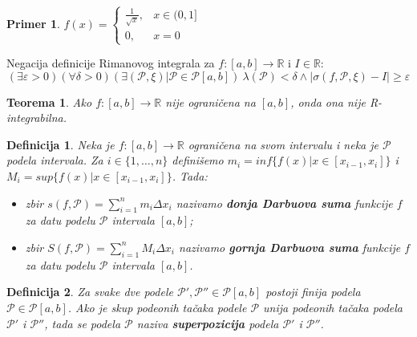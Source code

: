 \documentclass{article}
\newtheorem{definicija}{Definicija}[section]
\newtheorem{teorema}{Teorema}[section]
\newtheorem{prim}{Primer}[section]
\begin{document}
\begin{primbox}
    \begin{prim}
        $f(x)=
            \begin{cases}
                \frac{1}{\sqrt{x}}, & x \in (0,1] \\
                0,                  & x =0
            \end{cases}$
    \end{prim}
    Negacija definicije Rimanovog integrala za $f:[a,b]\longrightarrow\mathbb{R}$ i $I\in\mathbb{R}$:
    $$(\exists\varepsilon>0)(\forall\delta>0)(\exists(\mathcal{P},\xi)\big|\mathcal{P}\in\mathcal{P}[a,b])\ \lambda(\mathcal{P})<\delta\land|\sigma(f,\mathcal{P},\xi)-I|\geq\varepsilon$$
\end{primbox}
\begin{teoremabox}
    \begin{teorema}
        Ako $f: [a,b]\longrightarrow\mathbb{R}$ nije ograničena na $[a,b]$, onda ona nije R-integrabilna.
    \end{teorema}
\end{teoremabox}
\begin{defbox}
    \begin{definicija}
        Neka je $f:[a,b]\longrightarrow\mathbb{R}$ ograničena na svom intervalu i neka je $\mathcal{P}$ podela
        intervala. Za $i\in\{1,\dotsc,n\}$ definišemo $m_i=inf\{f(x)|x\in[x_{i-1},x_i]\}$ i $M_i=sup\{f(x)|x\in[x_{i-1},x_i]\}$.
        Tada:
        \begin{itemize}
            \item zbir $s(f,\mathcal{P})=\sum_{i=1}^{n}m_i\Delta x_i$ nazivamo \textbf{donja Darbuova suma} funkcije $f$ za datu podelu $\mathcal{P}$ intervala $[a,b]$;
            \item zbir $S(f,\mathcal{P})=\sum_{i=1}^{n}M_i\Delta x_i$ nazivamo \textbf{gornja Darbuova suma} funkcije $f$ za datu podelu $\mathcal{P}$ intervala $[a,b]$.
        \end{itemize}
    \end{definicija}
\end{defbox}

\begin{defbox}
    \begin{definicija}
        Za svake dve podele $\mathcal{P}', \mathcal{P}''\in\mathcal{P}[a,b]$ postoji finija
        podela $\mathcal{P}\in\mathcal{P}[a,b]$. Ako je skup podeonih tačaka podele $\mathcal{P}$
        unija podeonih tačaka podela $\mathcal{P}'$ i $\mathcal{P}''$, tada se podela $\mathcal{P}$
        naziva \textbf{superpozicija} podela $\mathcal{P}'$ i $\mathcal{P}''$.
    \end{definicija}
\end{defbox}
\end{document}
